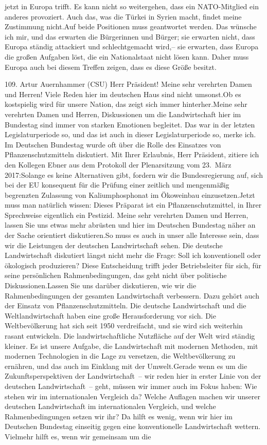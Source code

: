 \documentclass{article}
\begin{document}
jetzt in Europa trifft. Es kann nicht so weitergehen, dass ein NATO-Mitglied ein anderes provoziert. Auch das, was die Türkei in Syrien macht, findet meine Zustimmung nicht.Auf beide Positionen muss geantwortet werden. Das wünsche ich mir, und das erwarten die Bürgerinnen und Bürger; sie erwarten nicht, dass Europa ständig attackiert und schlechtgemacht wird,– sie erwarten, dass Europa die großen Aufgaben löst, die ein Nationalstaat nicht lösen kann. Daher muss Europa auch bei diesem Treffen zeigen, dass es diese Größe besitzt.




	109. Artur Auernhammer (CSU) Herr Präsident! Meine sehr verehrten Damen und Herren! Viele Reden hier im deutschen Haus sind nicht umsonst.Ob es kostspielig wird für unsere Nation, das zeigt sich immer hinterher.Meine sehr verehrten Damen und Herren, Diskussionen um die Landwirtschaft hier im Bundestag sind immer von starken Emotionen begleitet. Das war in der letzten Legislaturperiode so, und das ist auch in dieser Legislaturperiode so, merke ich. Im Deutschen Bundestag wurde oft über die Rolle des Einsatzes von Pflanzenschutzmitteln diskutiert. Mit Ihrer Erlaubnis, Herr Präsident, zitiere ich den Kollegen Ebner aus dem Protokoll der Plenarsitzung vom 23. März 2017:Solange es keine Alternativen gibt, fordern wir die Bundesregierung auf, sich bei der EU konsequent für die Prüfung einer zeitlich und mengenmäßig begrenzten Zulassung von Kaliumphosphonat im Ökoweinbau einzusetzen.Jetzt muss man natürlich wissen: Dieses Präparat ist ein Pflanzenschutzmittel, in Ihrer Sprechweise eigentlich ein Pestizid. Meine sehr verehrten Damen und Herren, lassen Sie uns etwas mehr abrüsten und hier im Deutschen Bundestag näher an der Sache orientiert diskutieren.So muss es auch in unser alle Interesse sein, dass wir die Leistungen der deutschen Landwirtschaft sehen. Die deutsche Landwirtschaft diskutiert längst nicht mehr die Frage: Soll ich konventionell oder ökologisch produzieren? Diese Entscheidung trifft jeder Betriebsleiter für sich, für seine persönlichen Rahmenbedingungen, das geht nicht über politische Diskussionen.Lassen Sie uns darüber diskutieren, wie wir die Rahmenbedingungen der gesamten Landwirtschaft verbessern. Dazu gehört auch der Einsatz von Pflanzenschutzmitteln. Die deutsche Landwirtschaft und die Weltlandwirtschaft haben eine große Herausforderung vor sich. Die Weltbevölkerung hat sich seit 1950 verdreifacht, und sie wird sich weiterhin rasant entwickeln. Die landwirtschaftliche Nutzfläche auf der Welt wird ständig kleiner. Es ist unsere Aufgabe, die Landwirtschaft mit modernen Methoden, mit modernen Technologien in die Lage zu versetzen, die Weltbevölkerung zu ernähren, und das auch im Einklang mit der Umwelt.Gerade wenn es um die Zukunftsperspektiven der Landwirtschaft – wir reden hier in erster Linie von der deutschen Landwirtschaft – geht, müssen wir immer auch im Fokus haben: Wie stehen wir im internationalen Vergleich da? Welche Auflagen machen wir unserer deutschen Landwirtschaft im internationalen Vergleich, und welche Rahmenbedingungen setzen wir ihr? Da hilft es wenig, wenn wir hier im Deutschen Bundestag einseitig gegen eine konventionelle Landwirtschaft wettern. Vielmehr hilft es, wenn wir gemeinsam um die 
\end{document}
